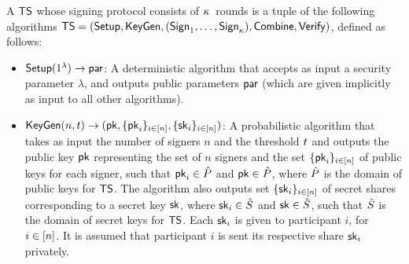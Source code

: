 \begin{definition} \label{def:threshold-sig}
  A  $\mathsf{TS}$ whose signing protocol consists of $\kappa$~rounds is a tuple of the following algorithms
  $\mathsf{TS} = (\mathsf{Setup}, \mathsf{KeyGen}, \allowbreak (\mathsf{Sign}_1, \ldots, \mathsf{Sign}_\kappa ), \allowbreak \mathsf{Combine}, \allowbreak \mathsf{Verify})$, defined as follows:


\begin{itemize}

  \item $\mathsf{Setup}(1^{\lambda}) \rightarrow \mathsf{par}$:
    A deterministic algorithm that accepts as input a security parameter $\lambda$,
    and outputs public parameters $\mathsf{par}$ (which are given implicitly as input to all other algorithms).

  \item $\mathsf{KeyGen}(n,t) \rightarrow (\mathsf{pk}, \{ \mathsf{pk}_i \}_{i \in [n]}, \{ \mathsf{sk}_i \}_{i \in [n]})$:
    A probabilistic algorithm that takes as input the number of signers $n$ and the threshold $t$ and outputs the public key $\mathsf{pk}$ representing the set of $n$
signers and the set $\{ \mathsf{pk}_i \}_{i \in [n]}$ of public keys for each signer,
    such that $\mathsf{pk}_i \in \hat{P}$ and $\mathsf{pk} \in \hat{P}$,
    where $\hat{P}$ is the domain of public keys for $\mathsf{TS}$.
    The algorithm also outputs set $\{ \mathsf{sk}_i \}_{i \in [n]}$ of secret shares corresponding to a secret key $\mathsf{sk}$,
    where $\mathsf{sk}_i \in \hat{S}$ and $\mathsf{sk} \in \hat{S}$,
    such that $\hat{S}$ is the domain of secret keys for $\mathsf{TS}$.
    Each $\mathsf{sk}_i$ is given to participant $i$, for $i \in [n]$.
    It is assumed that participant $i$ is sent its respective share $\mathsf{sk}_i$ privately.


\end{itemize}
\end{definition}
